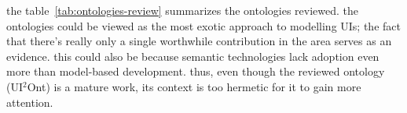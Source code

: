 the table~\ref{tab:ontologies-review} summarizes the ontologies reviewed.
the ontologies could be viewed as the most exotic approach to modelling UIs;
the fact that there's really only a single worthwhile contribution in the area serves as an evidence.
this could also be because semantic technologies lack adoption even more than model-based development.
thus, even though the reviewed ontology (UI$^{2}$Ont) is a mature work, its context is too hermetic for it to gain more attention.
